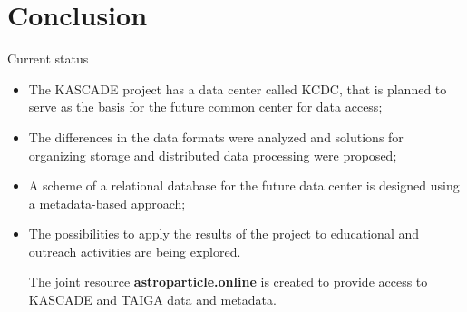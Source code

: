 \section{Conclusion}

\begin{frame}{Current status}
  \begin{itemize}
    \item The KASCADE project has a data center called KCDC, that is planned to serve as the basis for the future common center for data access;
    \item The differences in the data formats were analyzed and solutions for organizing storage and distributed data processing were proposed;
    \item A scheme of a relational database for the future data center is designed using a metadata-based approach;
  \item The possibilities to apply the results of the project to educational and outreach activities are being explored.

    The joint resource \textbf{\textcolor{kit-green100}{astroparticle.online}} is created to provide access to KASCADE and TAIGA data and metadata.
  \end{itemize}
\end{frame}

